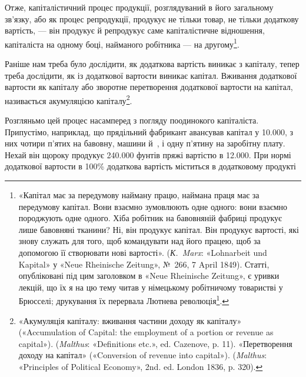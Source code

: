 Отже, капіталістичний процес продукції, розглядуваний в
його загальному зв’язку, або як процес репродукції, продукує
не тільки товар, не тільки додаткову вартість, — він продукує
й репродукує саме капіталістичне відношення, капіталіста на
одному боці, найманого робітника — на другому\footnote{
«Капітал має за передумову найману працю, наймана праця має за передумову
капітал. Вони взаємно зумовлюють одне одного: вони взаємно породжують одне
одного. Хіба робітник на бавовняній фабриці
продукує лише бавовняні тканини? Ні, він продукує капітал. Він продукує
вартості, які знову служать для того, щоб командувати над його працею, щоб за
допомогою її створювати нові вартості». (\emph{К.~Marx}:
«Lohnarbeit und Kapital» у «Neue Rheinische Zeitung», №~266, 7 April 1849).
Статті, опубліковані під цим заголовком в «Neue Rheinische Zeitung», є уривки
лекцій, що їх я на цю тему читав у німецькому
робітничому товаристві у Брюсселі; друкування їх перервала Лютнева
революція\footnote*{
Статті ці з’явилися потім окремою брошурою і під тією ж назвою.
Є українське видання: Партвидав «Пролетар» 1932~ \emph{Ред.}
}.
}.


Раніше нам треба було дослідити, як додаткова вартість виникає
з капіталу, тепер треба дослідити, як із додаткової вартости
виникає капітал. Вживання додаткової вартости як капіталу
або зворотне перетворення додаткової вартости на капітал, називається
акумуляцією капіталу\footnote{
«Акумуляція капіталу: вживання частини доходу як капіталу» («Accumulation of
Capital: the employment of a portion or revenue as capital»). (\emph{Malthus}:
«Definitions etc.», ed. Cazenove, p. 11).
«Перетворення доходу на капітал» («Conversion of revenue into capital»).
(\emph{Malthus}: «Principles of Political Economy», 2nd. ed. London 1836, p. 320).
}.

Розгляньмо цей процес насамперед з погляду поодинокого капіталіста. Припустімо,
наприклад, що прядільний фабрикант авансував капітал у \num{10.000},
з них чотири п’ятих на бавовну, машини й~, і одну п’ятину на заробітну
плату. Нехай він щороку продукує \num{240.000} фунтів пряжі
вартістю в \num{12.000}. При нормі додаткової вартости в 100\%
додаткова вартість міститься в додатковому продукті
\parbreak{}  %
